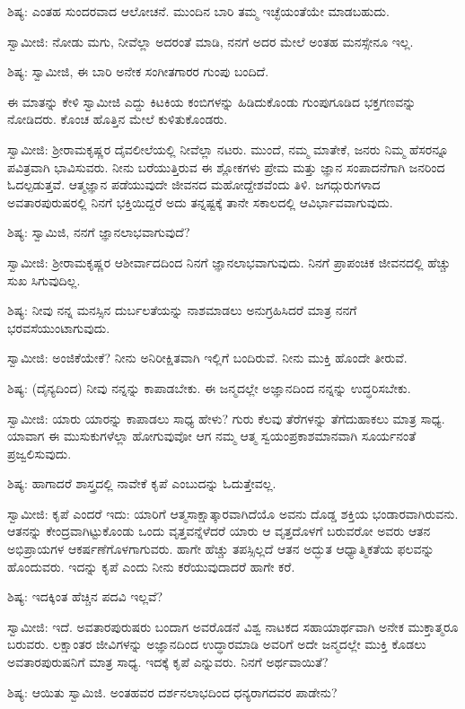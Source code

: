 ಶಿಷ್ಯ: ಎಂತಹ ಸುಂದರವಾದ ಆಲೋಚನೆ. ಮುಂದಿನ ಬಾರಿ ತಮ್ಮ ಇಚ್ಛೆಯಂತೆಯೇ ಮಾಡಬಹುದು.

ಸ್ವಾಮೀಜಿ: ನೋಡು ಮಗು, ನೀವೆಲ್ಲಾ ಅದರಂತೆ ಮಾಡಿ, ನನಗೆ ಅದರ ಮೇಲೆ ಅಂತಹ ಮನಸ್ಸೇನೂ ಇಲ್ಲ.

ಶಿಷ್ಯ: ಸ್ವಾಮೀಜಿ, ಈ ಬಾರಿ ಅನೇಕ ಸಂಗೀತಗಾರರ ಗುಂಪು ಬಂದಿದೆ.

ಈ ಮಾತನ್ನು ಕೇಳಿ ಸ್ವಾಮೀಜಿ ಎದ್ದು ಕಿಟಕಿಯ ಕಂಬಿಗಳನ್ನು ಹಿಡಿದುಕೊಂಡು ಗುಂಪುಗೂಡಿದ ಭಕ್ತಗಣವನ್ನು ನೋಡಿದರು. ಕೊಂಚ ಹೊತ್ತಿನ ಮೇಲೆ ಕುಳಿತುಕೊಂಡರು.

ಸ್ವಾಮೀಜಿ: ಶ‍್ರೀರಾಮಕೃಷ್ಣರ ದೈವಲೀಲೆಯಲ್ಲಿ ನೀವೆಲ್ಲಾ ನಟರು. ಮುಂದೆ, ನಮ್ಮ ಮಾತೇಕೆ, ಜನರು ನಿಮ್ಮ ಹೆಸರನ್ನೂ ಪವಿತ್ರವಾಗಿ ಭಾವಿಸುವರು. ನೀನು ಬರೆಯುತ್ತಿರುವ ಈ ಶ್ಲೋಕಗಳು ಪ್ರೇಮ ಮತ್ತು ಜ್ಞಾನ ಸಂಪಾದನೆಗಾಗಿ ಜನರಿಂದ ಓದಲ್ಪಡುತ್ತವೆ. ಆತ್ಮಜ್ಞಾನ ಪಡೆಯುವುದೇ ಜೀವನದ ಮಹೋದ್ದೇಶವೆಂದು ತಿಳಿ. ಜಗದ್ಗುರುಗಳಾದ ಅವತಾರಪುರುಷರಲ್ಲಿ ನಿನಗೆ ಭಕ್ತಿಯಿದ್ದರೆ ಅದು ತನ್ನಷ್ಟಕ್ಕೆ ತಾನೇ ಸಕಾಲದಲ್ಲಿ ಆವಿರ್ಭಾವವಾಗುವುದು.

ಶಿಷ್ಯ: ಸ್ವಾಮಿಜಿ, ನನಗೆ ಜ್ಞಾನಲಾಭವಾಗುವುದೆ?

ಸ್ವಾಮೀಜಿ: ಶ‍್ರೀರಾಮಕೃಷ್ಣರ ಆಶೀರ್ವಾದದಿಂದ ನಿನಗೆ ಜ್ಞಾನಲಾಭವಾಗುವುದು. ನಿನಗೆ ಪ್ರಾಪಂಚಿಕ ಜೀವನದಲ್ಲಿ ಹೆಚ್ಚು ಸುಖ ಸಿಗುವುದಿಲ್ಲ.

ಶಿಷ್ಯ: ನೀವು ನನ್ನ ಮನಸ್ಸಿನ ದುರ್ಬಲತೆಯನ್ನು ನಾಶಮಾಡಲು ಅನುಗ್ರಹಿಸಿದರೆ ಮಾತ್ರ ನನಗೆ ಭರವಸೆಯುಂಟಾಗುವುದು.

ಸ್ವಾಮೀಜಿ: ಅಂಜಿಕೆಯೇಕೆ? ನೀನು ಅನಿರೀಕ್ಷಿತವಾಗಿ ಇಲ್ಲಿಗೆ ಬಂದಿರುವೆ. ನೀನು ಮುಕ್ತಿ ಹೊಂದೇ ತೀರುವೆ.

ಶಿಷ್ಯ: (ದೈನ್ಯದಿಂದ) ನೀವು ನನ್ನನ್ನು ಕಾಪಾಡಬೇಕು. ಈ ಜನ್ಮದಲ್ಲೇ ಅಜ್ಞಾನದಿಂದ ನನ್ನನ್ನು ಉದ್ಧರಿಸಬೇಕು.

ಸ್ವಾಮೀಜಿ: ಯಾರು ಯಾರನ್ನು ಕಾಪಾಡಲು ಸಾಧ್ಯ ಹೇಳು? ಗುರು ಕೆಲವು ತೆರೆಗಳನ್ನು ತೆಗೆದುಹಾಕಲು ಮಾತ್ರ ಸಾಧ್ಯ. ಯಾವಾಗ ಈ ಮುಸುಕುಗಳೆಲ್ಲಾ ಹೋಗುವುವೋ ಆಗ ನಮ್ಮ ಆತ್ಮ ಸ್ವಯಂಪ್ರಕಾಶಮಾನವಾಗಿ ಸೂರ್ಯನಂತೆ ಪ್ರಜ್ವಲಿಸುವುದು.

ಶಿಷ್ಯ: ಹಾಗಾದರೆ ಶಾಸ್ತ್ರದಲ್ಲಿ ನಾವೇಕೆ ಕೃಪೆ ಎಂಬುದನ್ನು ಓದುತ್ತೇವಲ್ಲ.

ಸ್ವಾಮೀಜಿ: ಕೃಪೆ ಎಂದರೆ ಇದು: ಯಾರಿಗೆ ಆತ್ಮಸಾಕ್ಷಾತ್ಕಾರವಾಗಿದೆಯೊ ಅವನು ದೊಡ್ಡ ಶಕ್ತಿಯ ಭಂಡಾರವಾಗಿರುವನು. ಆತನನ್ನು ಕೇಂದ್ರವಾಗಿಟ್ಟುಕೊಂಡು ಒಂದು ವೃತ್ತವನ್ನೆಳೆದರೆ ಯಾರು ಆ ವೃತ್ತದೊಳಗೆ ಬರುವರೋ ಅವರು ಆತನ ಅಭಿಪ್ರಾಯಗಳ ಆಕರ್ಷಣೆಗೊಳಗಾಗುವರು. ಹಾಗೇ ಹೆಚ್ಚು ತಪಸ್ಸಿಲ್ಲದೆ ಆತನ ಅದ್ಭುತ ಆಧ್ಯಾತ್ಮಿಕತೆಯ ಫಲವನ್ನು ಹೊಂದುವರು. ಇದನ್ನು ಕೃಪೆ ಎಂದು ನೀನು ಕರೆಯುವುದಾದರೆ ಹಾಗೇ ಕರೆ.

ಶಿಷ್ಯ: ಇದಕ್ಕಿಂತ ಹೆಚ್ಚಿನ ಪದವಿ ಇಲ್ಲವೆ?

ಸ್ವಾಮೀಜಿ: ಇದೆ. ಅವತಾರಪುರುಷರು ಬಂದಾಗ ಅವರೊಡನೆ ವಿಶ್ವ ನಾಟಕದ ಸಹಾಯಾರ್ಥವಾಗಿ ಅನೇಕ ಮುಕ್ತಾತ್ಮರೂ ಬರುವರು. ಲಕ್ಷಾಂತರ ಜೀವಿಗಳನ್ನು ಅಜ್ಞಾನದಿಂದ ಉದ್ಧಾರಮಾಡಿ ಅವರಿಗೆ ಅದೇ ಜನ್ಮದಲ್ಲೇ ಮುಕ್ತಿ ಕೊಡಲು ಅವತಾರಪುರುಷನಿಗೆ ಮಾತ್ರ ಸಾಧ್ಯ. ಇದಕ್ಕೆ ಕೃಪೆ ಎನ್ನುವರು. ನಿನಗೆ ಅರ್ಥವಾಯಿತೆ?

ಶಿಷ್ಯ: ಆಯಿತು ಸ್ವಾಮಿಜಿ. ಅಂತಹವರ ದರ್ಶನಲಾಭದಿಂದ ಧನ್ಯರಾಗದವರ ಪಾಡೇನು?

